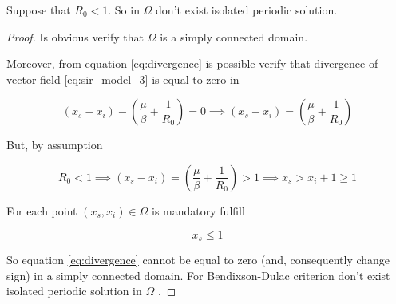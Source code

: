 \begin{theorem}
Suppose that $R_0 < 1$. So in $\Omega$ don't exist isolated periodic solution.
\end{theorem}

\begin{proof}
Is obvious verify that $\Omega$ is a simply connected domain.

Moreover, from equation \ref{eq:divergence} is possible verify that divergence of vector field \ref{eq:sir_model_3} is equal to zero in 

\begin{equation}
    (x_s - x_i) - \left(\frac{\mu}{\beta} + \frac{1}{R_0}\right) = 0 \implies (x_s - x_i) = \left(\frac{\mu}{\beta} + \frac{1}{R_0}\right) 
\end{equation}

But, by assumption

\begin{equation}
    R_0 < 1 \implies (x_s - x_i) = \left(\frac{\mu}{\beta} + \frac{1}{R_0}\right) > 1 \implies x_s > x_i + 1 \geq 1
\end{equation}

For each point $\left(x_s,x_i\right) \in \Omega$ is mandatory fulfill 

\begin{equation}
    x_s \leq 1
\end{equation}

So equation \ref{eq:divergence} cannot be equal to zero (and, consequently change sign) in a simply connected domain. For Bendixson-Dulac criterion \cite[pp.~67]{bib:khalil} don't exist isolated periodic solution in $\Omega$ .
\end{proof}